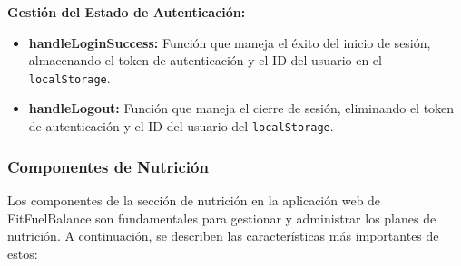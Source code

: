 \textbf{Gestión del Estado de Autenticación:}
\begin{itemize}
    \item \textbf{handleLoginSuccess:} Función que maneja el éxito del inicio de sesión, almacenando el token de autenticación y el ID del usuario en el \texttt{localStorage}.
    \item \textbf{handleLogout:} Función que maneja el cierre de sesión, eliminando el token de autenticación y el ID del usuario del \texttt{localStorage}.
\end{itemize}

\subsubsection{Componentes de Nutrición}
Los componentes de la sección de nutrición en la aplicación web de FitFuelBalance son fundamentales para gestionar y administrar los planes de nutrición. A continuación, se describen las características más importantes de estos:

